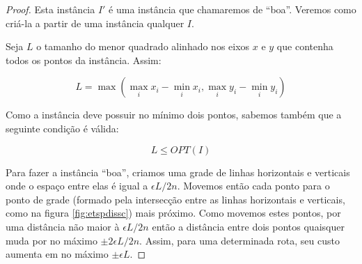 \begin{proof}

Esta instância $I'$ é uma instância que chamaremos de ``boa''. Veremos como criá-la a partir de uma instância qualquer $I$.

Seja $L$ o tamanho do menor quadrado alinhado nos eixos $x$ e $y$ que contenha todos os pontos da instância. Assim:

\begin{equation}
L = \max(\max_i x_i - \min_i x_i, \max_i y_i - \min_i y_i )
\end{equation}

Como a instância deve possuir no mínimo dois pontos, sabemos também que a seguinte condição é válida:

\begin{equation}
L \leq OPT(I)
\end{equation}

Para fazer a instância ``boa'', criamos uma grade de linhas horizontais e verticais onde o espaço entre elas é igual a $\epsilon L/2n$. Movemos então cada ponto para o ponto de grade (formado pela intersecção entre as linhas horizontais e verticais, como na figura \ref{fig:etspdissc}) mais próximo. Como movemos estes pontos, por uma distância não maior à $\epsilon L / 2 n$ então a distância entre dois pontos quaisquer muda por no máximo $ \pm 2 \epsilon L / 2 n  $. Assim, para uma determinada rota, seu custo aumenta em no máximo $\pm \epsilon L$.


\end{proof}

